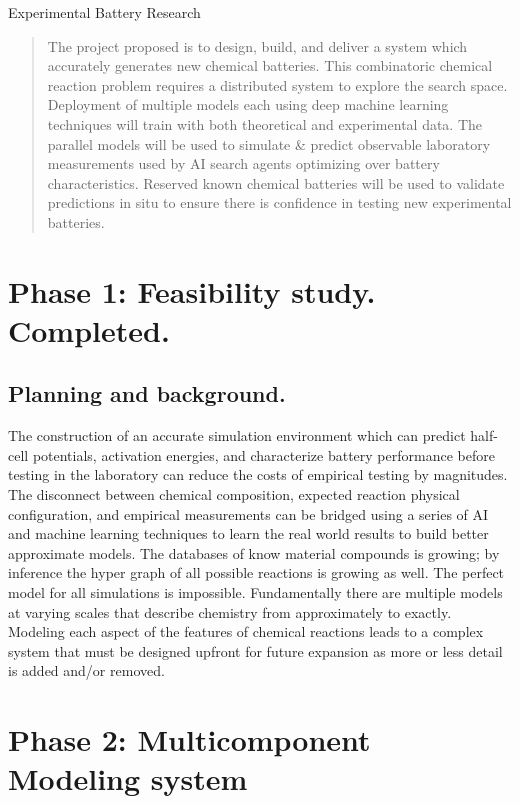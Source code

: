 \documentclass[10pt]{article}
\begin{document}
	Experimental Battery Research
\begin{abstract}
	The project proposed is to design, build, and deliver a system which accurately generates new chemical batteries.  This combinatoric chemical reaction problem requires a distributed system to explore the search space. Deployment of multiple models each using deep machine learning techniques will train with both theoretical and experimental data.  The parallel models will be used to simulate \& predict observable laboratory measurements used by AI search agents optimizing over battery characteristics. Reserved known chemical batteries will be used to validate predictions in situ to ensure there is confidence in testing new experimental batteries. 
\end{abstract}
\tableofcontents
\section{Phase 1: Feasibility study. Completed.}

\subsection{Planning and background.}
The construction of an accurate simulation environment which can predict half-cell potentials, activation energies, and characterize battery performance before testing in the laboratory can reduce the costs of empirical testing by magnitudes. The disconnect between chemical composition, expected reaction physical configuration, and empirical measurements can be bridged using a series of AI and machine learning techniques to learn the real world results to build better approximate models. The databases of know material compounds is growing; by inference the hyper graph of all possible reactions is growing as well.  The perfect model for all simulations is impossible. Fundamentally there are multiple models at varying scales that describe chemistry from approximately to exactly. Modeling each aspect of the features of chemical reactions leads to a complex system that must be designed upfront for future expansion as more or less detail is added and/or removed.\\


\newpage
\section{Phase 2: Multicomponent Modeling system}
\newpage
\end{document}
